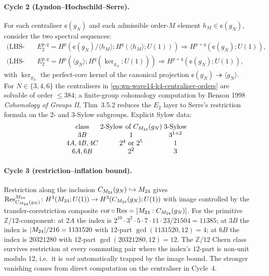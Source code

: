\paragraph{Cycle 2 (Lyndon--Hochschild--Serre).}
For each centraliser $\cent(g_N)$ and each admissible order-$M$
element $h_M\in\cent(g_N)$, consider the
two spectral sequences:
\begin{equation}
\label{eq:wn-wave14-k4-lhs-spectral}
\begin{aligned}
\text{(LHS-a):}\quad &
E_2^{p,q}=H^p(\cent(g_N)/\langle h_M\rangle;
H^q(\langle h_M\rangle;U(1)))
\Longrightarrow H^{p+q}(\cent(g_N);U(1)), \\
\text{(LHS-b):}\quad &
E_2^{p,q}=H^p(\langle g_N\rangle;H^q(\ker_{g_N};U(1)))
\Longrightarrow H^{p+q}(\cent(g_N);U(1)),
\end{aligned}
\end{equation}
with $\ker_{g_N}$ the perfect-core kernel of the canonical
projection $\cent(g_N)\twoheadrightarrow\langle g_N\rangle$.
For $N\in\{3,4,6\}$ the centralisers in
\eqref{eq:wn-wave14-k4-centraliser-orders} are solvable of
order $\le 384$; a finite-group cohomology computation by
Benson 1998 \emph{Cohomology of Groups II},
Thm~3.5.2 reduces the $E_2$ layer to
Serre's restriction formula on the $2$- and $3$-Sylow
subgroups. Explicit Sylow data:
\begin{equation}
\label{eq:wn-wave14-k4-sylow-reduction}
\begin{array}{c@{\;}c@{\;}c}
\text{class} & \text{$2$-Sylow of }\cent(g_N) & \text{$3$-Sylow} \\
3B & 1 & 3^{1+2} \\
4A,4B,4C & 2^4\text{ or }2^5 & 1 \\
6A,6B & 2^2 & 3 \\
\end{array}
\end{equation}

\paragraph{Cycle 3 (restriction--inflation bound).}
Restriction along the inclusion $C_{M_{24}}(g_N)\hookrightarrow M_{24}$
gives $\mathrm{Res}_{C_{M_{24}}(g_N)}^{M_{24}}\colon H^3(M_{24};U(1))\to
H^3(C_{M_{24}}(g_N);U(1))$ with image controlled by the
transfer-corestriction composite
$\mathrm{cor}\circ\mathrm{Res}=[M_{24}:C_{M_{24}}(g_N)]$. For the primitive
$\mathbb Z/12$-component: at $2A$ the index is
$2^{10}\cdot 3^2\cdot 5\cdot 7\cdot 11\cdot 23/21504=11385$;
at $3B$ the index is $|M_{24}|/216=1131520$ with $12$-part
$\gcd(1131520,12)=4$; at $6B$ the index is $20321280$ with
$12$-part $\gcd(20321280,12)=12$. The $\mathbb Z/12$
Chern class survives restriction at every commuting pair
where the index's $12$-part is non-unit modulo 12, i.e.\ it
is \emph{not} automatically trapped by the image bound.
The stronger vanishing comes from direct computation on the
centraliser in Cycle~4.

